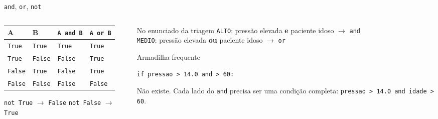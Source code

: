 \documentclass[aspectratio=169]{beamer}
\newcommand{\code}[1]{\texttt{\small #1}}
\begin{document}
\begin{frame}[fragile,shrink=5]{\texttt{and}, \texttt{or}, \texttt{not}}
  \begin{columns}[T]
    \begin{column}{0.5\textwidth}
      \begin{center}
      \small
      \begin{tabular}{@{}llll@{}}
        \toprule
        \textbf{A} & \textbf{B} & \code{A and B} & \code{A or B} \\
        \midrule
        \code{True}  & \code{True}  & \code{True}  & \code{True} \\
        \code{True}  & \code{False} & \code{False} & \code{True} \\
        \code{False} & \code{True}  & \code{False} & \code{True} \\
        \code{False} & \code{False} & \code{False} & \code{False} \\
        \bottomrule
      \end{tabular}
      \end{center}
      \vspace{0.2cm}
      {\small \code{not True} $\to$ \code{False} \hspace{0.4cm}
      \code{not False} $\to$ \code{True}}
    \end{column}
    \begin{column}{0.46\textwidth}
      \begin{block}{No enunciado da triagem}
        \code{ALTO}: pressão elevada \textbf{e} paciente idoso
        $\to$ \code{and} \\[0.25cm]
        \code{MEDIO}: pressão elevada \textbf{ou} paciente idoso
        $\to$ \code{or}
      \end{block}
      \begin{alertblock}{Armadilha frequente}
\begin{lstlisting}
if pressao > 14.0 and > 60:
\end{lstlisting}
        Não existe. Cada lado do \code{and} precisa ser uma condição
        completa: \code{pressao > 14.0 and idade > 60}.
      \end{alertblock}
    \end{column}
  \end{columns}
\end{frame}
\end{document}
